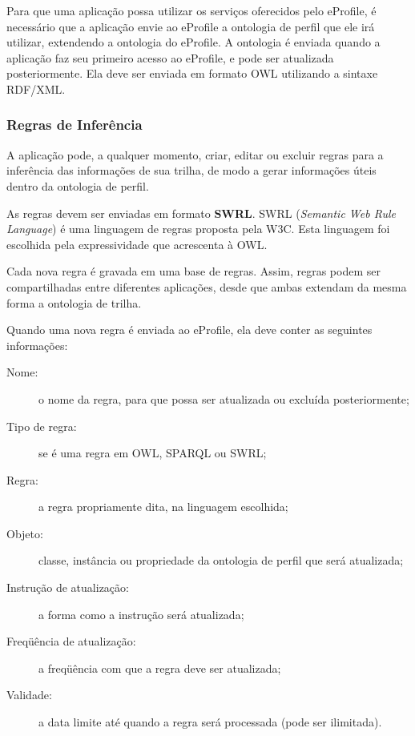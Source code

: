 Para que uma aplicação possa utilizar os serviços oferecidos pelo eProfile, é necessário que a aplicação envie ao eProfile a ontologia de perfil que ele irá utilizar, extendendo a ontologia do eProfile. A ontologia é enviada quando a aplicação faz seu primeiro acesso ao eProfile, e pode ser atualizada posteriormente. Ela deve ser enviada em formato OWL utilizando a sintaxe RDF/XML\cite{rdf}.


\subsubsection{Regras de Inferência}

A aplicação pode, a qualquer momento, criar, editar ou excluir regras para a inferência das informações de sua trilha, de modo a gerar informações úteis dentro da ontologia de perfil.

As regras devem ser enviadas em formato \textbf{SWRL}\cite{swrl}. SWRL ({\em Semantic Web Rule Language}) é uma linguagem de regras proposta pela W3C. Esta linguagem foi escolhida pela expressividade que acrescenta à OWL.

Cada nova regra é gravada em uma base de regras. Assim, regras podem ser compartilhadas entre diferentes aplicações, desde que ambas extendam da mesma forma a ontologia de trilha.

Quando uma nova regra é enviada ao eProfile, ela deve conter as seguintes informações:

\begin{description}
  \item[Nome:] o nome da regra, para que possa ser atualizada ou excluída posteriormente;
  \item[Tipo de regra:] se é uma regra em OWL, SPARQL ou SWRL;
  \item[Regra:] a regra propriamente dita, na linguagem escolhida;
  \item[Objeto:] classe, instância ou propriedade da ontologia de perfil que será atualizada;
  \item[Instrução de atualização:] a forma como a instrução será atualizada;
  \item[Freqüência de atualização:] a freqüência com que a regra deve ser atualizada;
  \item[Validade:] a data limite até quando a regra será processada (pode ser ilimitada).
\end{description}

